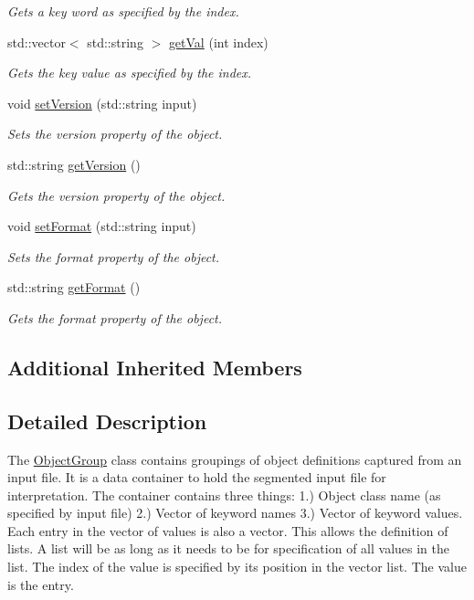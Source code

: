 \begin{DoxyCompactItemize}
\begin{DoxyCompactList}\small\item\em Gets a key word as specified by the index. \end{DoxyCompactList}\item 
std\-::vector$<$ std\-::string $>$ \hyperlink{classosea_1_1_object_group_a35ccc728179fdc3db8712f553746caf9}{get\-Val} (int index)
\begin{DoxyCompactList}\small\item\em Gets the key value as specified by the index. \end{DoxyCompactList}\item 
void \hyperlink{classosea_1_1_object_group_a33955b7630b2709483c2f635cbff2ac7}{set\-Version} (std\-::string input)
\begin{DoxyCompactList}\small\item\em Sets the version property of the object. \end{DoxyCompactList}\item 
std\-::string \hyperlink{classosea_1_1_object_group_aa3603cc9c8ae5a0d3e1dc73cc531cb6b}{get\-Version} ()
\begin{DoxyCompactList}\small\item\em Gets the version property of the object. \end{DoxyCompactList}\item 
void \hyperlink{classosea_1_1_object_group_a41a1aa49d18643e322f0ca1917c08bff}{set\-Format} (std\-::string input)
\begin{DoxyCompactList}\small\item\em Sets the format property of the object. \end{DoxyCompactList}\item 
std\-::string \hyperlink{classosea_1_1_object_group_a8e08f57a3e0bcaa7e81ba45173ef6e55}{get\-Format} ()
\begin{DoxyCompactList}\small\item\em Gets the format property of the object. \end{DoxyCompactList}\end{DoxyCompactItemize}
\subsection*{Additional Inherited Members}


\subsection{Detailed Description}
The \hyperlink{classosea_1_1_object_group}{Object\-Group} class contains groupings of object definitions captured from an input file. It is a data container to hold the segmented input file for interpretation. The container contains three things\-: 1.) Object class name (as specified by input file) 2.) Vector of keyword names 3.) Vector of keyword values. Each entry in the vector of values is also a vector. This allows the definition of lists. A list will be as long as it needs to be for specification of all values in the list. The index of the value is specified by its position in the vector list. The value is the entry. 

